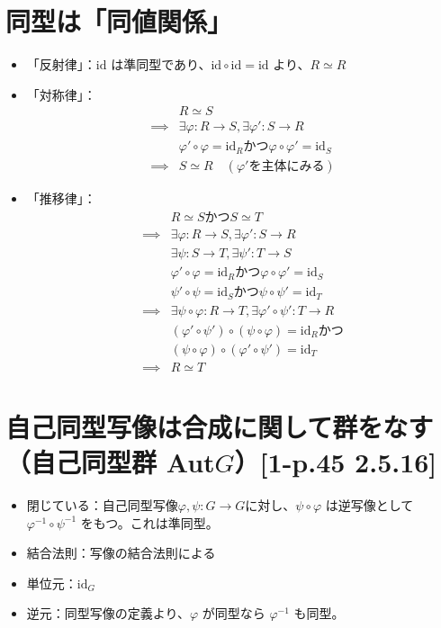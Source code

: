 \documentclass[twocolumn]{jsarticle}
\newcommand{\id}{\text{id}}
\newcommand{\inv}[1]{#1^{-1}}
\renewcommand{\phi}{\varphi}
\begin{document}
\section{同型は「同値関係」}
\begin{itemize}
    \item 「反射律」：\(\id\) は準同型であり、\(\id \circ \id = \id\) より、\(R\simeq R\)
    \item 「対称律」：
    \begin{align*}
        & R\simeq S \\
\implies& \exists\phi\colon R\to S, \exists\phi'\colon S\to R\\
        &\phi'\circ\phi=\id_{R} かつ \phi\circ\phi'=\id_{S} \\
\implies& S\simeq R\quad(\phi' を主体にみる)
    \end{align*} 
    \item 「推移律」：
    \begin{align*}
        & R\simeq S かつ S \simeq T \\
\implies& \exists\phi\colon R\to S, \exists\phi'\colon S\to R\\                  & \exists\psi\colon S\to T, \exists\psi'\colon T\to S\\
        &\phi'\circ\phi=\id_{R} かつ \phi\circ\phi'=\id_{S} \\
        &\psi'\circ\psi=\id_{S} かつ \psi\circ\psi'=\id_{T} \\
\implies& \exists\psi\circ\phi\colon R\to T, \exists\phi'\circ\psi'\colon T\to R\\       
        &(\phi'\circ\psi')\circ(\psi\circ\phi)=\id_{R} かつ \\
        &(\psi\circ\phi)\circ(\phi'\circ\psi')=\id_{T} \\
\implies& R\simeq T
    \end{align*} 
\end{itemize}

\section{自己同型写像は合成に関して群をなす
（自己同型群 Aut\(G\)）[1-p.45 2.5.16]}
\begin{itemize}
    \item 閉じている：自己同型写像\(\phi, \psi\colon G\to G\)に対し、\(\psi\circ\phi\) は逆写像として \(\inv{\phi}\circ\inv{\psi}\) をもつ。これは準同型。
    \item 結合法則：写像の結合法則による
    \item 単位元：\(\id_G\) 
    \item 逆元：同型写像の定義より、\(\phi\) が同型なら \(\inv{\phi}\) も同型。
\end{itemize}
\end{document}
